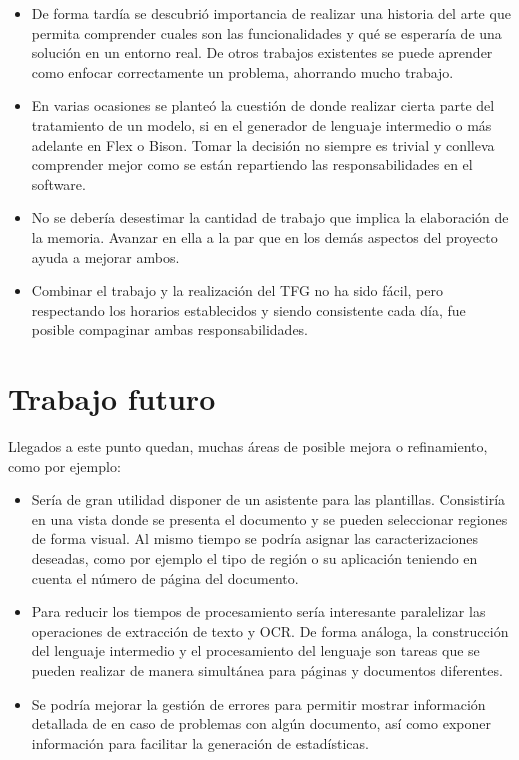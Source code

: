 \begin{itemize}
	\item De forma tardía se descubrió importancia de realizar una historia del arte que permita comprender cuales son las funcionalidades y qué se esperaría de una solución en un entorno real. De otros trabajos existentes se puede aprender como enfocar correctamente un problema, ahorrando mucho trabajo.
	\item En varias ocasiones se planteó la cuestión de donde realizar cierta parte del tratamiento de un modelo, si en el generador de lenguaje intermedio o más adelante en Flex o Bison. Tomar la decisión no siempre es trivial y conlleva comprender mejor como se están repartiendo las responsabilidades en el software.
	\item No se debería desestimar la cantidad de trabajo que implica la elaboración de la memoria. Avanzar en ella a la par que en los demás aspectos del proyecto ayuda a mejorar ambos.
	\item Combinar el trabajo y la realización del TFG no ha sido fácil, pero respectando los horarios establecidos y siendo consistente cada día, fue posible compaginar ambas responsabilidades.
\end{itemize}

\section{Trabajo futuro}

Llegados a este punto quedan, muchas áreas de posible mejora o refinamiento, como por ejemplo:

\begin{itemize}
	\item Sería de gran utilidad disponer de un asistente para las plantillas. Consistiría en una vista donde se presenta el documento y se pueden seleccionar regiones de forma visual. Al mismo tiempo se podría asignar las caracterizaciones deseadas, como por ejemplo el tipo de región o su aplicación teniendo en cuenta el número de página del documento.
	\item Para reducir los tiempos de procesamiento sería interesante paralelizar las operaciones de extracción de texto y OCR. De forma análoga, la construcción del lenguaje intermedio y el procesamiento del lenguaje son tareas que se pueden realizar de manera simultánea para páginas y documentos diferentes.
	\item Se podría mejorar la gestión de errores para permitir mostrar información detallada de en caso de problemas con algún documento, así como exponer información para facilitar la generación de estadísticas.
\end{itemize}
